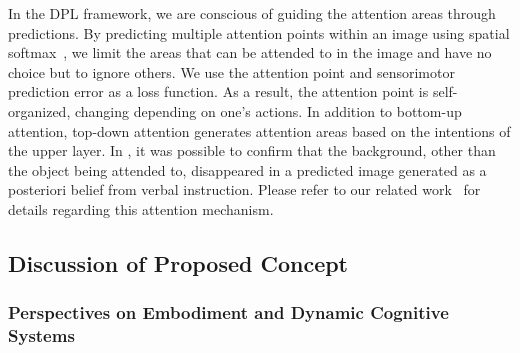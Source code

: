 In the DPL framework, we are conscious of guiding the attention areas through predictions. By predicting multiple attention points within an image using spatial softmax~\cite{finn2016deep}, we limit the areas that can be attended to in the image and have no choice but to ignore others. We use the attention point and sensorimotor prediction error as a loss function. As a result, the attention point is self-organized, changing depending on one's actions. In addition to bottom-up attention, top-down attention generates attention areas based on the intentions of the upper layer. In \cite{Ito2022integrated}, it was possible to confirm that the background, other than the object being attended to, disappeared in a predicted image generated as a posteriori belief from verbal instruction. Please refer to our related work~\cite{Ito2022integrated,Ichiwara2022contact,Ichiwara2023ral} for details regarding this attention mechanism.



\subsection{Discussion of Proposed Concept}
\subsubsection{Perspectives on Embodiment and Dynamic Cognitive Systems}

